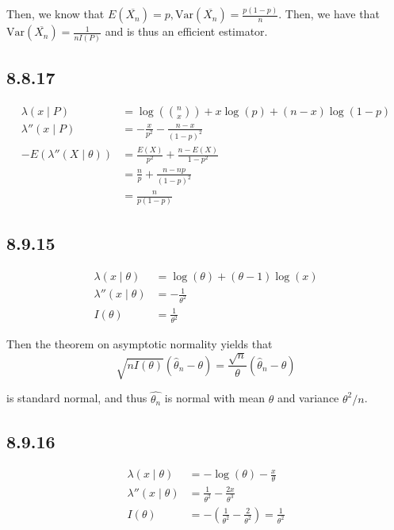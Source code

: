 \documentclass[12pt,letterpaper]{article}
\theoremstyle{definition}
\newcommand{\var}[1]{\text{Var}\left(#1\right)}
\begin{document}
Then, we know that $E(\overline{X_n}) = p, \var{\overline{X_n}}=
\frac{p(1-p)}{n}$. Then, we have that $\var{\overline{X_n}} = \frac{1}{nI(P)}$
and is thus an efficient estimator.

\subsection*{8.8.17}


\begin{align*}
  \lambda(x \mid P) &= \log(\binom{n}{x}) + x\log(p) + (n-x)\log(1-p) \\
  \lambda''(x \mid P) &= -\frac{x}{p^2} - \frac{n-x}{(1-p)^2} \\
  -E(\lambda''(X \mid \theta)) &= \frac{E(X)}{p^2} + \frac{n-E(X)}{1-p^2} \\
                    &= \frac{n}{p} + \frac{n-np}{(1-p)^2} \\
                    &= \frac{n}{p(1-p)}
\end{align*}

\subsection*{8.9.15}

\begin{align*}
  \lambda(x \mid \theta) &= \log(\theta) + (\theta - 1)\log(x) \\
  \lambda''(x \mid \theta) &= -\frac{1}{\theta^2} \\
  I(\theta) &= \frac{1}{\theta^2}
\end{align*}

Then the theorem on asymptotic normality yields that
\[
  \sqrt{nI(\theta)}(\hat{\theta}_n - \theta) = \frac{\sqrt{n}}{\theta}(\hat{\theta}_n - \theta) 
\]

is standard normal, and thus $\hat{\theta_n}$ is normal with mean $\theta$ and
variance $\theta^2/n$.

\subsection*{8.9.16}

\begin{align*}
  \lambda(x \mid \theta) &= -\log(\theta) - \frac{x}{\theta} \\
  \lambda''(x \mid \theta) &= \frac{1}{\theta^2} - \frac{2x}{\theta^3} \\
  I(\theta) &= -(\frac{1}{\theta^2} - \frac{2}{\theta^2}) = \frac{1}{\theta^2} 
\end{align*}
\end{document}
